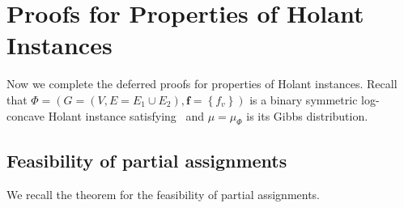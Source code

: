 \documentclass[11pt]{article}
\newcommand{\set}[1]{\left\{#1\right\}}
\newcommand{\vecf}{\boldsymbol{f}}
\begin{document}










\appendix

\section{Proofs for Properties of Holant Instances} \label{sec:proof-Holant-properties}

Now we complete the deferred proofs for properties of Holant instances. Recall that $\Phi = (G = (V, E = E_1 \cup E_2), \vecf = \set{f_v})$ is a binary symmetric log-concave Holant instance satisfying~ and $\mu = \mu_\Phi$ is its Gibbs distribution.

\subsection{Feasibility of partial assignments}

We recall the theorem for the feasibility of partial assignments.
\PartialFeasibility*
\end{document}
